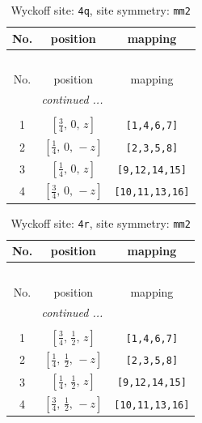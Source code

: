 \documentclass[fleqn,8pt]{jsarticle}
\begin{document}
\renewcommand{\arraystretch}{1.2}
\begin{longtable}{ccc}
\caption{Wyckoff site: {\tt 4q}, site symmetry: {\tt mm2}}
 \\
 \hline \hline
No. & position & mapping \\ \hline \endfirsthead

\multicolumn{2}{l}{\tablename\ \thetable{}} \\
 \hline \hline
No. & position & mapping \\ \hline \endhead

 \hline \hline
\multicolumn{2}{r}{\footnotesize\it continued ...} \\ \endfoot

 \hline \hline
\multicolumn{2}{r}{} \\ \endlastfoot

1 & $\left[ \frac{3}{4},\, 0,\, z \right]$ & {\tt [1,4,6,7]} \\ \hline
2 & $\left[ \frac{1}{4},\, 0,\, - z \right]$ & {\tt [2,3,5,8]} \\ \hline
3 & $\left[ \frac{1}{4},\, 0,\, z \right]$ & {\tt [9,12,14,15]} \\ \hline
4 & $\left[ \frac{3}{4},\, 0,\, - z \right]$ & {\tt [10,11,13,16]} \\
\end{longtable}
\renewcommand{\arraystretch}{1.2}
\begin{longtable}{ccc}
\caption{Wyckoff site: {\tt 4r}, site symmetry: {\tt mm2}}
 \\
 \hline \hline
No. & position & mapping \\ \hline \endfirsthead

\multicolumn{2}{l}{\tablename\ \thetable{}} \\
 \hline \hline
No. & position & mapping \\ \hline \endhead

 \hline \hline
\multicolumn{2}{r}{\footnotesize\it continued ...} \\ \endfoot

 \hline \hline
\multicolumn{2}{r}{} \\ \endlastfoot

1 & $\left[ \frac{3}{4},\, \frac{1}{2},\, z \right]$ & {\tt [1,4,6,7]} \\ \hline
2 & $\left[ \frac{1}{4},\, \frac{1}{2},\, - z \right]$ & {\tt [2,3,5,8]} \\ \hline
3 & $\left[ \frac{1}{4},\, \frac{1}{2},\, z \right]$ & {\tt [9,12,14,15]} \\ \hline
4 & $\left[ \frac{3}{4},\, \frac{1}{2},\, - z \right]$ & {\tt [10,11,13,16]} \\
\end{longtable}
\end{document}

